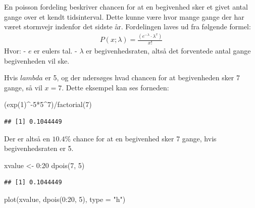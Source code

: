 \documentclass[
]{article}
\newenvironment{Shaded}{\begin{snugshade}}{\end{snugshade}}
\newcommand{\AttributeTok}[1]{\textcolor[rgb]{0.77,0.63,0.00}{#1}}
\newcommand{\DecValTok}[1]{\textcolor[rgb]{0.00,0.00,0.81}{#1}}
\newcommand{\FunctionTok}[1]{\textcolor[rgb]{0.00,0.00,0.00}{#1}}
\newcommand{\NormalTok}[1]{#1}
\newcommand{\OtherTok}[1]{\textcolor[rgb]{0.56,0.35,0.01}{#1}}
\newcommand{\SpecialCharTok}[1]{\textcolor[rgb]{0.00,0.00,0.00}{#1}}
\newcommand{\StringTok}[1]{\textcolor[rgb]{0.31,0.60,0.02}{#1}}
\begin{document}
En poisson fordeling beskriver chancen for at en begivenhed sker et
givet antal gange over et kendt tidsinterval. Dette kunne være hvor
mange gange der har været stormvejr indenfor det sidste år. Fordelingen
laves ud fra følgende formel: \[
\begin{aligned}
P(x;\lambda) = \frac{(e^{-\lambda}\cdot\lambda^x)}{x!}
\end{aligned}
\] Hvor: - \(e\) er eulers tal. - \(\lambda\) er begivenhedsraten, altså
det forventede antal gange begivenheden vil ske.

Hvis \(lambda\) er 5, og der ndersøges hvad chancen for at begivenheden
sker 7 gange, så vil \(x=7\). Dette eksempel kan ses forneden:

\begin{Shaded}
\begin{Highlighting}[]
\NormalTok{(}\FunctionTok{exp}\NormalTok{(}\DecValTok{1}\NormalTok{)}\SpecialCharTok{\^{}{-}}\DecValTok{5}\SpecialCharTok{*}\DecValTok{5}\SpecialCharTok{\^{}}\DecValTok{7}\NormalTok{)}\SpecialCharTok{/}\FunctionTok{factorial}\NormalTok{(}\DecValTok{7}\NormalTok{)}
\end{Highlighting}
\end{Shaded}

\begin{verbatim}
## [1] 0.1044449
\end{verbatim}

Der er altså en \(10.4\%\) chance for at en begivenhed sker 7 gange,
hvis begivenhedsraten er 5.

\begin{Shaded}
\begin{Highlighting}[]
\NormalTok{xvalue }\OtherTok{\textless{}{-}} \DecValTok{0}\SpecialCharTok{:}\DecValTok{20}
\FunctionTok{dpois}\NormalTok{(}\DecValTok{7}\NormalTok{, }\DecValTok{5}\NormalTok{)}
\end{Highlighting}
\end{Shaded}

\begin{verbatim}
## [1] 0.1044449
\end{verbatim}

\begin{Shaded}
\begin{Highlighting}[]
\FunctionTok{plot}\NormalTok{(xvalue, }\FunctionTok{dpois}\NormalTok{(}\DecValTok{0}\SpecialCharTok{:}\DecValTok{20}\NormalTok{, }\DecValTok{5}\NormalTok{), }\AttributeTok{type =} \StringTok{"h"}\NormalTok{)}
\end{Highlighting}
\end{Shaded}
\end{document}
